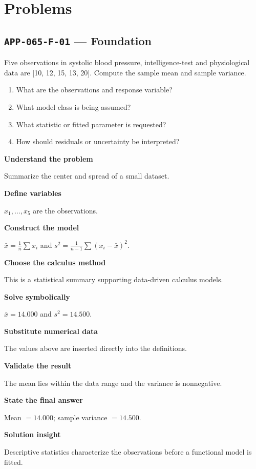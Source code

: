 \documentclass[11pt]{book}
\newcommand{\pid}[1]{\texttt{#1}}
\begin{document}
\section*{Problems}
\subsection*{\pid{APP-065-F-01} — Foundation}
\begin{problembox}
Five observations in systolic blood pressure, intelligence-test and physiological data are [10, 12, 15, 13, 20]. Compute the sample mean and sample variance.
\end{problembox}
\begin{promptbox}\begin{enumerate}
\item What are the observations and response variable?
\item What model class is being assumed?
\item What statistic or fitted parameter is requested?
\item How should residuals or uncertainty be interpreted?
\end{enumerate}\end{promptbox}
\begin{solutionbox}
\textbf{Understand the problem}\par Summarize the center and spread of a small dataset.\par\medskip
\textbf{Define variables}\par $x_1,\dots,x_5$ are the observations.\par\medskip
\textbf{Construct the model}\par $\bar x=\frac1n\sum x_i$ and $s^2=\frac1{n-1}\sum(x_i-\bar x)^2$.\par\medskip
\textbf{Choose the calculus method}\par This is a statistical summary supporting data-driven calculus models.\par\medskip
\textbf{Solve symbolically}\par $\bar x=14.000$ and $s^2=14.500$.\par\medskip
\textbf{Substitute numerical data}\par The values above are inserted directly into the definitions.\par\medskip
\textbf{Validate the result}\par The mean lies within the data range and the variance is nonnegative.\par\medskip
\textbf{State the final answer}\par Mean $=14.000$; sample variance $=14.500$.\par\medskip
\textbf{Solution insight}\par Descriptive statistics characterize the observations before a functional model is fitted.\par\medskip
\end{solutionbox}
\end{document}
